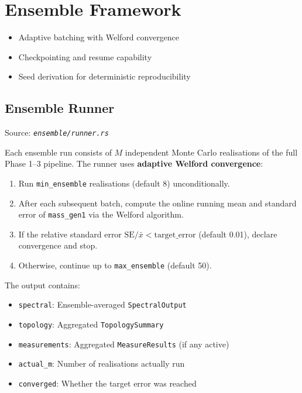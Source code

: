 \documentclass[11pt, a4paper, openany]{book}
\newcommand{\code}[1]{\texttt{#1}}
\newcommand{\file}[1]{\texttt{\itshape #1}}
\newcounter{thm}[chapter]
\newenvironment{introduction}[1][Chapter Overview]{%
  \begin{tcolorbox}[
    enhanced,colback=structure!5,colframe=structure,
    colbacktitle=structure,coltitle=white,
    fonttitle=\small\bfseries,title={#1},
    arc=2pt,boxrule=0.7pt,
    left=8pt,right=8pt,top=6pt,bottom=6pt,
    before skip=12pt,after skip=12pt
  ]\itshape\begin{itemize}[leftmargin=*,itemsep=2pt,parsep=0pt]
}{%
  \end{itemize}\end{tcolorbox}
}
\begin{document}
\chapter{Ensemble Framework}

\begin{introduction}
  \item Adaptive batching with Welford convergence
  \item Checkpointing and resume capability
  \item Seed derivation for deterministic reproducibility
\end{introduction}

\section{Ensemble Runner}

Source: \file{ensemble/runner.rs}

Each ensemble run consists of $M$ independent Monte Carlo realisations of the
full Phase 1--3 pipeline.  The runner uses \textbf{adaptive Welford convergence}:

\begin{enumerate}
  \item Run \code{min\_ensemble} realisations (default 8) unconditionally.
  \item After each subsequent batch, compute the online running mean and
        standard error of \code{mass\_gen1} via the Welford algorithm.
  \item If the relative standard error $\text{SE}/\bar{x} <
        \text{target\_error}$ (default 0.01), declare convergence and stop.
  \item Otherwise, continue up to \code{max\_ensemble} (default 50).
\end{enumerate}

\begin{definition}[EnsembleResult]
  The output contains:
  \begin{itemize}
    \item \code{spectral}: Ensemble-averaged \code{SpectralOutput}
    \item \code{topology}: Aggregated \code{TopologySummary}
    \item \code{measurements}: Aggregated \code{MeasureResults} (if any active)
    \item \code{actual\_m}: Number of realisations actually run
    \item \code{converged}: Whether the target error was reached
  \end{itemize}
\end{definition}
\end{document}
